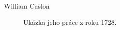 \documentclass[fyma2,pdf,final]{prosper}
\begin{document}
\begin{slide}{William Caslon}

\begin{center}
		 \begin{figure}
			\caption{Ukázka jeho práce z roku 1728.}
		 \end{figure}
        \end{center}
\end{slide}
\end{document}
